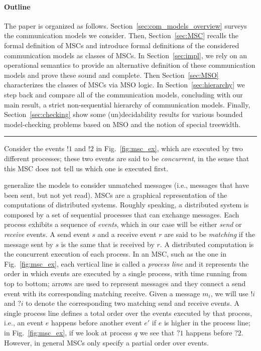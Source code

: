 \paragraph{\bf Outline} The paper is organized as follows. Section~\ref{sec:com_models_overview} surveys the communication models we consider.  Then, Section~\ref{sec:MSC} recalls the formal definition of MSCs and introduce formal definitions of the considered communication models as classes of MSCs.
In Section~\ref{sec:impl}, we rely on
an operational semantics to provide an alternative definition of these communication models and prove these sound and complete.
Then Section~\ref{sec:MSO} characterizes the classes of MSCs via MSO logic.
In Section~\ref{sec:hierarchy} we step back and compare all of the communication models, concluding with our main result, a strict non-sequential hierarchy of communication models.
Finally, Section~\ref{sec:checking} show some (un)decidability results for various bounded model-checking
problems based on MSO and the notion of special treewidth.


\hrule

\bigskip


Consider the events $!1$ and $!2$ in Fig.~\ref{fig:msc_ex}, which are executed by two different processes; these two events are said to be \emph{concurrent}, in the sense that this MSC does not tell us which one is executed first.

generalize the models to  consider unmatched messages (i.e., messages that have been sent, but not yet read).
MSCs are a graphical representation of the  computations of distributed systems.  Roughly speaking, a distributed system is composed by a set of sequential processes that can exchange messages. Each process exhibits a sequence of \emph{events}, which in our case will be either \emph{send} or \emph{receive} events. A send event $s$ and a receive event $r$ are said to be \emph{matching} if the message sent by $s$ is the same  that is received by $r$. A distributed computation is the concurrent execution of each process. In an MSC, such as the one in Fig.~\ref{fig:msc_ex}, each vertical line is called a \emph{process line} and it represents the order in which events are executed by a single process, with time running from top to bottom; arrows are used to represent messages and they connect a send event with its corresponding matching receive.
Given a message $m_i$, we will use $!i$ and $?i$ to denote the corresponding two matching send and receive events. A single process line defines a total order over the events executed by that process, i.e., an event $e$ happens before another event $e'$ if $e$ is higher in the process line; in Fig.~\ref{fig:msc_ex}, if we look at process $q$ we see that $?1$ happens before $?2$. However, in general MSCs only specify a partial order over events.


